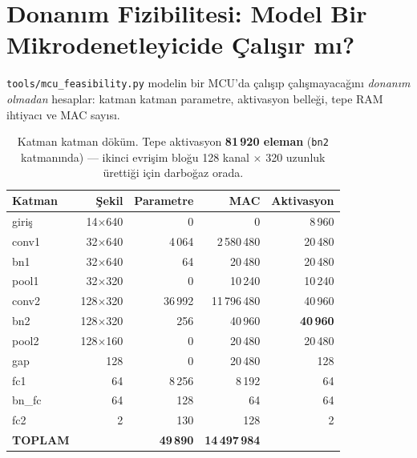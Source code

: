 \documentclass[11pt,a4paper]{report}
\newcommand{\kod}[1]{\texttt{\small #1}}
\begin{document}
\clearpage

\chapter{Donanım Fizibilitesi: Model Bir Mikrodenetleyicide Çalışır mı?}

\kod{tools/mcu\_feasibility.py} modelin bir MCU'da çalışıp çalışmayacağını
\emph{donanım olmadan} hesaplar: katman katman parametre, aktivasyon belleği,
tepe RAM ihtiyacı ve MAC sayısı.

\begin{table}[H]
\centering\small
\begin{tabular}{@{}lrrrr@{}}
\toprule
\textbf{Katman} & \textbf{Şekil} & \textbf{Parametre} & \textbf{MAC} & \textbf{Aktivasyon} \\
\midrule
giriş  & 14$\times$640  & 0      & 0          & 8\,960 \\
conv1  & 32$\times$640  & 4\,064 & 2\,580\,480 & 20\,480 \\
bn1    & 32$\times$640  & 64     & 20\,480    & 20\,480 \\
pool1  & 32$\times$320  & 0      & 10\,240    & 10\,240 \\
conv2  & 128$\times$320 & 36\,992 & 11\,796\,480 & 40\,960 \\
bn2    & 128$\times$320 & 256    & 40\,960    & \textbf{40\,960} \\
pool2  & 128$\times$160 & 0      & 20\,480    & 20\,480 \\
gap    & 128            & 0      & 20\,480    & 128 \\
fc1    & 64             & 8\,256 & 8\,192     & 64 \\
bn\_fc & 64             & 128    & 64         & 64 \\
fc2    & 2              & 130    & 128        & 2 \\
\midrule
\textbf{TOPLAM} & & \textbf{49\,890} & \textbf{14\,497\,984} & \\
\bottomrule
\end{tabular}
\caption{Katman katman döküm. Tepe aktivasyon \textbf{81\,920 eleman}
(\kod{bn2} katmanında) --- ikinci evrişim bloğu 128 kanal $\times$ 320 uzunluk
ürettiği için darboğaz orada.}
\end{table}
\end{document}
